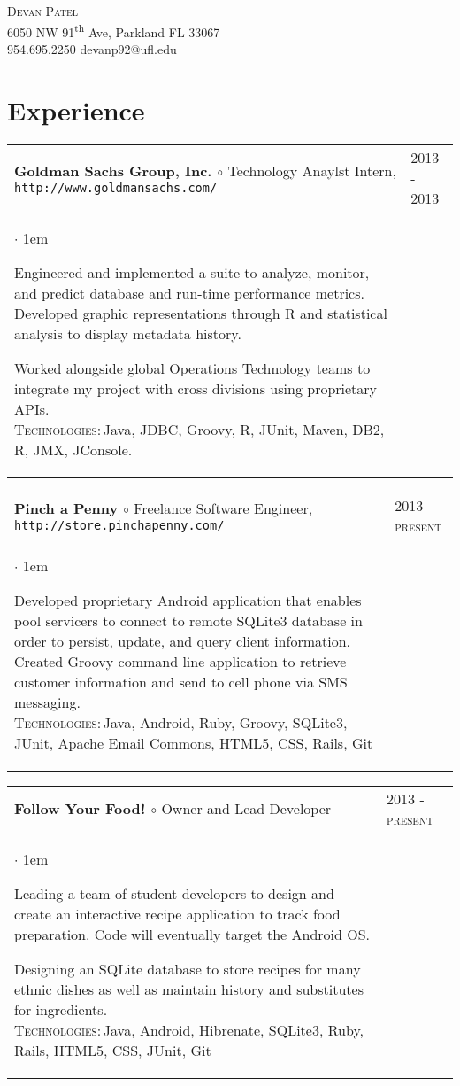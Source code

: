 \documentclass[11pt]{article}
\makeatletter
\newcommand{\employer}[4]
	{{ \begin{tabular}{l@{\hspace{5mm}}|p{30mm}}
	   \multicolumn{1}{l}{\textbf{#1 $\circ$ }#2}&\multicolumn{1}{p{30mm}}{\hspace{-3mm}\textsc{#3}} \\
	   \parbox{.825\textwidth}{#4 \vspace*{-4pt}}
	   \end{tabular} \vspace{4pt} }}
\newcommand{\contact}[4]
	{\begin{center}
		{\LARGE \scshape{#1}}\\
		#2\\
		\Telefon \hspace{0.5ex} #3 \hspace{1em} \Letter \hspace{0.5ex} #4
	\end{center}
	\vspace*{-8pt}}
\newenvironment{achievements}           %
	{\begin{list}{$\cdot$}{\topsep 0pt \itemsep 4pt \parsep 0pt \leftmargin 1em}
	 \linespread{1.05} \selectfont %
	}
	{\end{list}\vspace*{4pt}}
\def\kt{\vspace*{2pt}\\\textsc{Technologies:\,}}
\makeatother
\begin{document}
\contact{Devan Patel}
{6050 NW 91\textsuperscript{th} Ave, Parkland FL 33067}
{954.695.2250}
{devanp92@ufl.edu}

\section{Experience}
\employer{Goldman Sachs Group, Inc.}{Technology Anaylst Intern, \texttt{http://www.goldmansachs.com/}}{2013 - 2013}{
	\begin{achievements}
	
	\item{Engineered and implemented a suite to analyze, monitor, and predict database and run-time performance metrics. Developed graphic representations through R and statistical analysis to display metadata history.}
		
	\item{Worked alongside global Operations Technology teams to integrate my project with cross divisions using proprietary APIs.\kt Java, JDBC, Groovy, R, JUnit, Maven, DB2, R, JMX, JConsole.}

	\end{achievements} 
}


\employer{Pinch a Penny}{Freelance Software Engineer, \texttt{http://store.pinchapenny.com/}}{2013 - present}{
	\begin{achievements}
	
	\item{Developed proprietary Android application that enables pool servicers to connect to remote SQLite3 database in order to persist, update, and query client information. Created Groovy command line application to retrieve customer information and send to cell phone via SMS messaging.  \kt Java, Android, Ruby, Groovy, SQLite3, JUnit, Apache Email Commons, HTML5, CSS, Rails, Git}
	
	\end{achievements}
}

\employer{Follow Your Food!}{Owner and Lead Developer}{2013 - present}{
	\begin{achievements}
	
	\item{Leading a team of student developers to design and create an interactive recipe application to track food preparation. Code will eventually target the Android OS.}
	
	\item{Designing an SQLite database to store recipes for many ethnic dishes as well as maintain history and substitutes for ingredients.\kt Java, Android, Hibrenate, SQLite3, Ruby, Rails, HTML5, CSS, JUnit, Git}
	
	\end{achievements}
}
\end{document}
